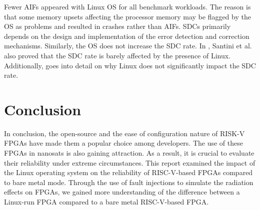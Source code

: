 \documentclass[conference]{IEEEtran}
\begin{document}
Fewer AIFs appeared with Linux OS for all benchmark workloads. The reason is that some memory upsets affecting the processor memory 
may be flagged by the OS as problems and resulted in crashes rather than AIFs. SDCs primarily depends on the design and implementation of the error 
detection and correction mechanisms. Similarly, the OS does not increase the SDC rate. In \cite{b6}, Santini et al. also proved that the SDC 
rate is barely affected by the presence of Linux. Additionally, \cite{b7} goes into detail on why Linux does not significantly impact the SDC rate. 

\section{Conclusion}
In conclusion, the open-source and the ease of configuration nature of RISK-V FPGAs have made them a popular choice among developers. 
The use of these FPGAs in nanosats is also gaining attraction. As a result, it is crucial to evaluate their reliability under extreme 
circumstances. This report examined the impact of the Linux operating system on the reliability of RISC-V-based FPGAs compared 
to bare metal mode. Through the use of fault injections to simulate the radiation effects on FPGAs, we gained more understanding of 
the difference between a Linux-run FPGA compared to a bare metal RISC-V-based FPGA. 
\end{document}
